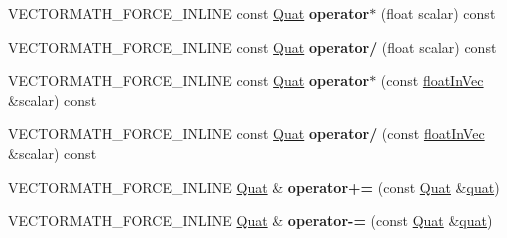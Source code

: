 \begin{DoxyCompactItemize}
\item 
\hypertarget{class_vectormath_1_1_aos_1_1_quat_afd84816c09bc288ad0ae83b1b69e3f8a}{V\+E\+C\+T\+O\+R\+M\+A\+T\+H\+\_\+\+F\+O\+R\+C\+E\+\_\+\+I\+N\+L\+I\+N\+E const \hyperlink{class_vectormath_1_1_aos_1_1_quat}{Quat} {\bfseries operator$\ast$} (float scalar) const }\label{class_vectormath_1_1_aos_1_1_quat_afd84816c09bc288ad0ae83b1b69e3f8a}

\item 
\hypertarget{class_vectormath_1_1_aos_1_1_quat_acea1f8a115df91ed3ee6b00837e107b8}{V\+E\+C\+T\+O\+R\+M\+A\+T\+H\+\_\+\+F\+O\+R\+C\+E\+\_\+\+I\+N\+L\+I\+N\+E const \hyperlink{class_vectormath_1_1_aos_1_1_quat}{Quat} {\bfseries operator/} (float scalar) const }\label{class_vectormath_1_1_aos_1_1_quat_acea1f8a115df91ed3ee6b00837e107b8}

\item 
\hypertarget{class_vectormath_1_1_aos_1_1_quat_a2c58cfee10bb5743dadd016626c3ca4f}{V\+E\+C\+T\+O\+R\+M\+A\+T\+H\+\_\+\+F\+O\+R\+C\+E\+\_\+\+I\+N\+L\+I\+N\+E const \hyperlink{class_vectormath_1_1_aos_1_1_quat}{Quat} {\bfseries operator$\ast$} (const \hyperlink{class_vectormath_1_1float_in_vec}{float\+In\+Vec} \&scalar) const }\label{class_vectormath_1_1_aos_1_1_quat_a2c58cfee10bb5743dadd016626c3ca4f}

\item 
\hypertarget{class_vectormath_1_1_aos_1_1_quat_a704b49f3f8e12740407bee261da66c01}{V\+E\+C\+T\+O\+R\+M\+A\+T\+H\+\_\+\+F\+O\+R\+C\+E\+\_\+\+I\+N\+L\+I\+N\+E const \hyperlink{class_vectormath_1_1_aos_1_1_quat}{Quat} {\bfseries operator/} (const \hyperlink{class_vectormath_1_1float_in_vec}{float\+In\+Vec} \&scalar) const }\label{class_vectormath_1_1_aos_1_1_quat_a704b49f3f8e12740407bee261da66c01}

\item 
\hypertarget{class_vectormath_1_1_aos_1_1_quat_a9158dc25a79ed436657256b16768ec31}{V\+E\+C\+T\+O\+R\+M\+A\+T\+H\+\_\+\+F\+O\+R\+C\+E\+\_\+\+I\+N\+L\+I\+N\+E \hyperlink{class_vectormath_1_1_aos_1_1_quat}{Quat} \& {\bfseries operator+=} (const \hyperlink{class_vectormath_1_1_aos_1_1_quat}{Quat} \&\hyperlink{classquat}{quat})}\label{class_vectormath_1_1_aos_1_1_quat_a9158dc25a79ed436657256b16768ec31}

\item 
\hypertarget{class_vectormath_1_1_aos_1_1_quat_a97803eacef896d4cffceda9dc551b43d}{V\+E\+C\+T\+O\+R\+M\+A\+T\+H\+\_\+\+F\+O\+R\+C\+E\+\_\+\+I\+N\+L\+I\+N\+E \hyperlink{class_vectormath_1_1_aos_1_1_quat}{Quat} \& {\bfseries operator-\/=} (const \hyperlink{class_vectormath_1_1_aos_1_1_quat}{Quat} \&\hyperlink{classquat}{quat})}\label{class_vectormath_1_1_aos_1_1_quat_a97803eacef896d4cffceda9dc551b43d}


\end{DoxyCompactItemize}
